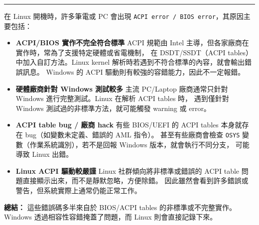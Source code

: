 \documentclass{article}
\begin{document}
\bigskip
\hrule %
\bigskip
在 Linux 開機時，許多筆電或 PC 會出現 \texttt{ACPI error / BIOS error}，其原因主要包括：

\begin{itemize}
  \item \textbf{ACPI/BIOS 實作不完全符合標準}  
  ACPI 規範由 Intel 主導，但各家廠商在實作時，常為了支援特定硬體或省電機制，
  在 DSDT/SSDT（ACPI tables）中加入自訂方法。Linux kernel 解析時若遇到不符合標準的內容，就會輸出錯誤訊息。
  Windows 的 ACPI 驅動則有較強的容錯能力，因此不一定報錯。

  \item \textbf{硬體廠商針對 Windows 測試較多}  
  主流 PC/Laptop 廠商通常只針對 Windows 進行完整測試。Linux 在解析 ACPI tables 時，
  遇到僅針對 Windows 測試過的非標準方法，就可能觸發 warning 或 error。

  \item \textbf{ACPI table bug / 廠商 hack}  
  有些 BIOS/UEFI 的 ACPI tables 本身就存在 bug（如變數未定義、錯誤的 AML 指令）。
  甚至有些廠商會檢查 \texttt{OSYS} 變數（作業系統識別），若不是回報 Windows 版本，就會執行不同分支，
  可能導致 Linux 出錯。

  \item \textbf{Linux ACPI 驅動較嚴謹}  
  Linux 社群傾向將非標準或錯誤的 ACPI table 問題直接顯示出來，而不是靜默忽略，方便除錯。
  因此雖然會看到許多錯誤或警告，但系統實際上通常仍能正常工作。
\end{itemize}

\textbf{總結：}  
這些錯誤碼多半來自於 BIOS/ACPI tables 的非標準或不完整實作。
Windows 透過相容性容錯掩蓋了問題，而 Linux 則會直接記錄下來。
\end{document}
